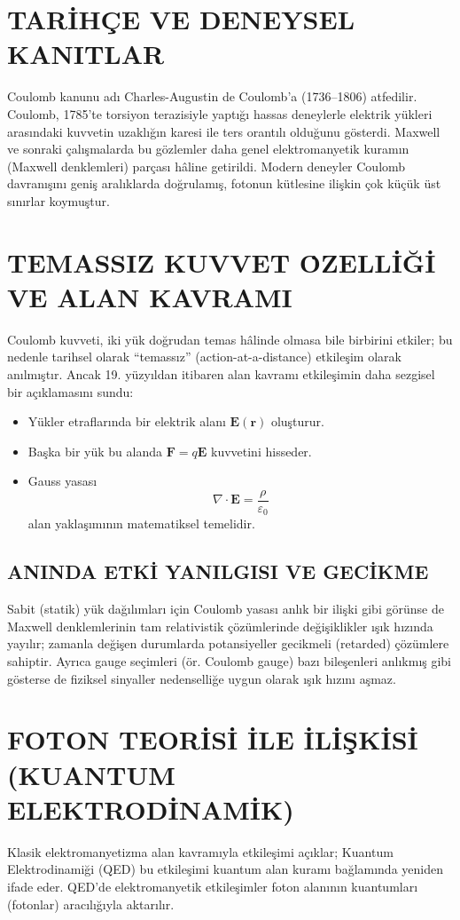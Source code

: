 \documentclass[conference,a4paper]{IEEEtran}
\begin{document}
\section{TAR\.{I}H\c{C}E VE DENEYSEL KANITLAR}
Coulomb kanunu adı Charles-Augustin de Coulomb'a (1736--1806) atfedilir. Coulomb, 1785'te torsiyon terazisiyle yaptığı hassas deneylerle elektrik yükleri arasındaki kuvvetin uzaklığın karesi ile ters orantılı olduğunu gösterdi. Maxwell ve sonraki çalışmalarda bu gözlemler daha genel elektromanyetik kuramın (Maxwell denklemleri) parçası hâline getirildi. Modern deneyler Coulomb davranışını geniş aralıklarda doğrulamış, fotonun kütlesine ilişkin çok küçük üst sınırlar koymuştur.

\section{TEMASSIZ KUVVET \.{O}ZELL\.{I}Ğ\.{I} VE ALAN KAVRAMI}
Coulomb kuvveti, iki yük doğrudan temas hâlinde olmasa bile birbirini etkiler; bu nedenle tarihsel olarak ``temassız'' (action-at-a-distance) etkileşim olarak anılmıştır. Ancak 19. yüzyıldan itibaren alan kavramı etkileşimin daha sezgisel bir açıklamasını sundu:
\begin{itemize}
  \item Yükler etraflarında bir elektrik alanı \(\mathbf{E}(\mathbf r)\) oluşturur.
  \item Başka bir yük bu alanda \(\mathbf{F}=q\mathbf{E}\) kuvvetini hisseder.
  \item Gauss yasası
  \begin{equation}
  \nabla\cdot\mathbf{E}=\frac{\rho}{\varepsilon_0}
  \end{equation}
  alan yaklaşımının matematiksel temelidir.
\end{itemize}

\subsection{ANINDA ETK\.{I} YANILGISI VE GEC\.{I}KME}
Sabit (statik) yük dağılımları için Coulomb yasası anlık bir ilişki gibi görünse de Maxwell denklemlerinin tam relativistik çözümlerinde değişiklikler ışık hızında yayılır; zamanla değişen durumlarda potansiyeller gecikmeli (retarded) çözümlere sahiptir. Ayrıca gauge seçimleri (ör. Coulomb gauge) bazı bileşenleri anlıkmış gibi gösterse de fiziksel sinyaller nedenselliğe uygun olarak ışık hızını aşmaz.

\section{FOTON TEOR\.{I}S\.{I} İLE İLİ\c{S}KİSİ (KUANTUM ELEKTRODİNAMİK)}
Klasik elektromanyetizma alan kavramıyla etkileşimi açıklar; Kuantum Elektrodinamiği (QED) bu etkileşimi kuantum alan kuramı bağlamında yeniden ifade eder. QED'de elektromanyetik etkileşimler foton alanının kuantumları (fotonlar) aracılığıyla aktarılır.
\end{document}
